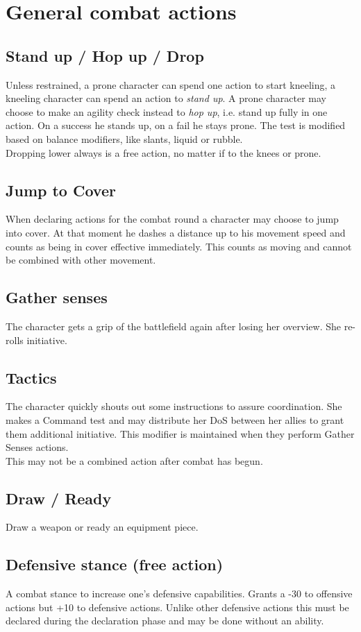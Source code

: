 \section{General combat actions}
\subsection*{Stand up / Hop up / Drop}
Unless restrained, a prone character can spend one action to start kneeling, a kneeling character can spend an action to \emph{stand up}. A prone character may choose to make an agility check instead to \emph{hop up}, i.e. stand up fully in one action. On a success he stands up, on a fail he stays prone. The test is modified based on balance modifiers, like slants, liquid or rubble.\\
Dropping lower always is a free action, no matter if to the knees or prone.
\subsection*{Jump to Cover}
When declaring actions for the combat round a character may choose to jump into cover.
At that moment he dashes a distance up to his movement speed
	and counts as being in cover effective immediately.
This counts as moving and cannot be combined with other movement.
\subsection*{Gather senses}
The character gets a grip of the battlefield again after losing her overview. She re-rolls initiative.
\subsection*{Tactics}
The character quickly shouts out some instructions to assure coordination. She makes a Command test and may distribute her DoS between her allies to grant them additional initiative. This modifier is maintained when they perform Gather Senses actions.\\
This may not be a combined action after combat has begun.
\subsection*{Draw / Ready}
Draw a weapon or ready an equipment piece.
\subsection*{Defensive stance (free action)}
A combat stance to increase one’s defensive capabilities. Grants a -30 to offensive actions but +10 to defensive actions. Unlike other defensive actions this must be declared during the declaration phase and may be done without an ability.
